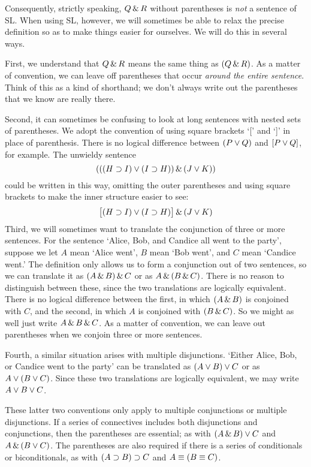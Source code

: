 Consequently, strictly speaking, $Q \,\&\, R$ without parentheses is \emph{not} a sentence of SL. When using SL, however, we will sometimes be able to relax the precise definition so as to make things easier for ourselves. We will do this in several ways.

First,  we understand that $Q \,\&\, R$ means the same thing as $(Q \,\&\, R)$. As a matter of convention, we can leave off parentheses that occur \emph{around the entire sentence}. Think of this as a kind of shorthand; we don't always write out the parentheses that we know are really there.

Second, it can sometimes be confusing to look at long sentences with nested sets of parentheses. We adopt the convention of using square brackets `[' and `]' in place of parenthesis. There is no logical difference between $(P\vee Q)$ and $[P\vee Q]$, for example. The unwieldy sentence
$$(((H \supset I) \vee (I \supset H)) \,\&\, (J \vee K))$$
could be written in this way, omitting the outer parentheses and using square brackets to make the inner structure easier to see:
$$\bigl[(H \supset I) \vee (I \supset H)\bigr] \,\&\, (J \vee K)$$
Third, we will sometimes want to translate the conjunction of three or more sentences. For the sentence `Alice, Bob, and Candice all went to the party', suppose we let $A$ mean `Alice went', $B$ mean `Bob went', and $C$ mean `Candice went.' The definition only allows us to form a conjunction out of two sentences, so we can translate it as $(A \,\&\, B) \,\&\, C$ or as $A \,\&\, (B \,\&\, C)$. There is no reason to distinguish between these, since the two translations are logically equivalent. There is no logical difference between the first, in which $(A \,\&\, B)$ is conjoined with $C$, and the second, in which $A$ is conjoined with $(B \,\&\, C)$.  So we might as well just write $A \,\&\, B \,\&\, C$. As a matter of convention, we can leave out parentheses when we conjoin three or more sentences.

Fourth, a similar situation arises with multiple disjunctions. `Either Alice, Bob, or Candice went to the party' can be translated as $(A \vee B) \vee C$ or as $A \vee (B \vee C)$. Since these two translations are logically equivalent, we may write $A \vee B \vee C$.

These latter two conventions only apply to multiple conjunctions or multiple  disjunctions. If a series of connectives includes both disjunctions and conjunctions, then the parentheses are essential; as with $(A \,\&\, B) \vee C$ and $A \,\&\, (B \vee C)$. The parentheses are also required if there is a series of conditionals or biconditionals, as with $(A \supset B) \supset C$ and $A \equiv (B \equiv C)$.

